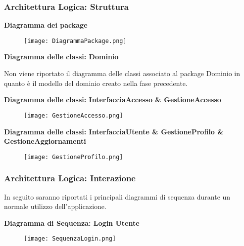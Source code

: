 \newpage
\subsubsection{Architettura Logica: Struttura}
\hfill \break

\textbf{Diagramma dei package}
\hfill \break

\begin{figure}[h!]
    \begin{center}
        \texttt{[image: DiagrammaPackage.png]}
    \end{center}
\end{figure}
\hfill \break

\textbf{Diagramma delle classi: Dominio}
\hfill \break

Non viene riportato il diagramma delle classi associato al package Dominio in quanto è il modello del dominio creato nella fase precedente.

\newpage

\textbf{Diagramma delle classi: InterfacciaAccesso \& GestioneAccesso}
\hfill \break

\begin{figure}[h!]
    \begin{center}
        \texttt{[image: GestioneAccesso.png]}
    \end{center}
\end{figure}
\hfill \break

\textbf{Diagramma delle classi: InterfacciaUtente \& GestioneProfilo \& GestioneAggiornamenti }

\begin{figure}[h!]
    \begin{center}
        \texttt{[image: GestioneProfilo.png]}
    \end{center}
\end{figure}
\hfill \break
\newpage

\subsubsection{Architettura Logica: Interazione}

In seguito saranno riportati i principali diagrammi di sequenza durante un normale utilizzo dell'applicazione.
\hfill \break

\textbf{Diagramma di Sequenza: Login Utente}

\begin{figure}[h!]
    \begin{center}
        \texttt{[image: SequenzaLogin.png]}
    \end{center}
\end{figure}
\hfill \break

